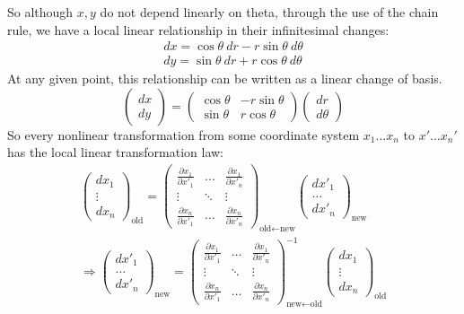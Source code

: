 	So although $x,y$ do not depend linearly on theta, through the use of the chain rule, we have a local linear relationship in their infinitesimal changes:
	\begin{align*}
		dx = \cos \theta ~dr - r \sin \theta ~d\theta\\
		dy = \sin \theta ~dr + r \cos \theta ~d\theta
	\end{align*}
	At any given point, this relationship can be written as a linear change of basis.
	\begin{equation*}
		\begin{pmatrix}
			dx \\ dy
		\end{pmatrix}
		 = 
		 \begin{pmatrix}
		 	\cos \theta & - r \sin \theta \\
			\sin \theta & r \cos \theta
		 \end{pmatrix}
		 \begin{pmatrix}
		 	dr \\
			d\theta
		 \end{pmatrix}
	\end{equation*}
	So every nonlinear transformation from some coordinate system $x_1 \dots x_n$ to $x' \dots x_n'$ has the local linear transformation law:
	\begin{align*}
		\begin{pmatrix}
			dx_1 \\ \vdots \\ dx_n 
		\end{pmatrix}_{\text{old}}
		=
	 \begin{pmatrix}
	 	\frac{\partial x_1}{\partial x'_1} & \dots & \frac{\partial x_1}{\partial x'_n} \\
		\vdots & \ddots & \vdots \\
		\frac{\partial x_n}{\partial x'_1} & \dots & \frac{\partial x_n}{\partial x'_n}
	 \end{pmatrix}_{\text{old} \leftarrow \text{new}}
	 \begin{pmatrix}
	 	dx'_1 \\ \dots \\ dx'_n
	 \end{pmatrix}_{\text{new}}\\
	 \Rightarrow 
	 \begin{pmatrix}
	 	dx'_1 \\ \dots \\ dx'_n
	 \end{pmatrix}_{\text{new}}
		=
	 \begin{pmatrix}
	 	\frac{\partial x_1}{\partial x'_1} & \dots & \frac{\partial x_1}{\partial x'_n} \\
		\vdots & \ddots & \vdots \\
		\frac{\partial x_n}{\partial x'_1} & \dots & \frac{\partial x_n}{\partial x'_n}
	 \end{pmatrix}^{-1}_{\text{new} \leftarrow \text{old}}
	\begin{pmatrix}
		dx_1 \\ \vdots \\ dx_n 
	\end{pmatrix}_{\text{old}}
	\end{align*}
